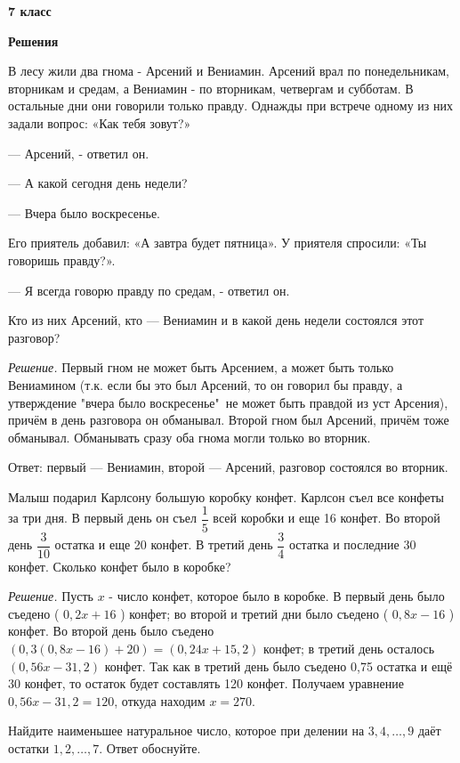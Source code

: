 \centerline{\bf \huge 7 класс}
\centerline{\bf \huge Решения}

В лесу жили два гнома - Арсений и Вениамин. Арсений врал по понедельникам, вторникам и средам, а Вениамин - по вторникам, четвергам и субботам. В остальные дни они говорили только правду. Однажды при встрече одному из них задали вопрос: «Как тебя зовут?»

--- Арсений, - ответил он.

--- А какой сегодня день недели?

--- Вчера было воскресенье.

Его приятель добавил: «А завтра будет пятница». У приятеля спросили: «Ты говоришь правду?».

--- Я всегда говорю правду по средам, - ответил он.

Кто из них Арсений, кто --- Вениамин и в какой день недели состоялся этот разговор?

\textit{Решение.}
Первый гном не может быть Арсением, а может быть только Вениамином (т.к. если бы это был Арсений, то он говорил бы правду, а утверждение "вчера было воскресенье"\ не может быть правдой из уст Арсения), причём в день разговора он обманывал. Второй гном был Арсений, причём тоже обманывал. Обманывать сразу оба гнома могли только во вторник.

Ответ: первый --- Вениамин, второй --- Арсений, разговор состоялся во вторник.

Малыш подарил Карлсону большую коробку конфет. Карлсон съел все конфеты за три дня. В первый день он съел $\dfrac{1}{5}$ всей коробки и еще 16 конфет. Во второй день $\dfrac{3}{10}$ остатка и еще 20 конфет. В третий день $\dfrac{3}{4}$ остатка и последние 30 конфет. Сколько конфет было в коробке?


\textit{Решение.} Пусть $x$ - число конфет, которое было в коробке. В первый день было съедено ( $0,2 x+16$ ) конфет; во второй и третий дни было съедено ( $0,8 x-16$ ) конфет. Во второй день было съедено $(0,3(0,8 x-16)+20)=(0,24 x+15,2)$ конфет; в третий день осталось $(0,56 x-31,2)$ конфет. Так как в третий день было съедено 0,75 остатка и ещё 30 конфет, то остаток будет составлять 120 конфет. Получаем уравнение $0,56 x-31,2=120$, откуда находим $x=270$.

\newpage

\hspace{3mm}

Найдите наименьшее натуральное число, которое при делении на $3,4, \ldots, 9$ даёт остатки $1, 2, \ldots, 7.$ Ответ обоснуйте.


